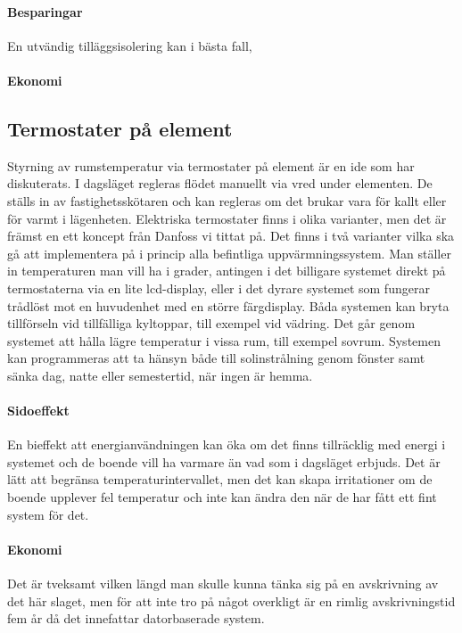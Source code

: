 \paragraph{Besparingar}
En utvändig tilläggsisolering kan i bästa fall, 

\paragraph{Ekonomi}

\subsection{Termostater på element}
Styrning av rumstemperatur via termostater på element är en ide som har diskuterats. I dagsläget regleras flödet manuellt via vred under elementen. De ställs in av fastighetsskötaren och kan regleras om det brukar vara för kallt eller för varmt i lägenheten. 
Elektriska termostater finns i olika varianter, men det är främst en ett koncept från Danfoss vi tittat på. Det finns i två varianter vilka ska gå att implementera på i princip alla befintliga uppvärmningssystem. Man ställer in temperaturen man vill ha i grader, antingen i det billigare systemet direkt på termostaterna via en lite lcd-display, eller i det dyrare systemet som fungerar trådlöst mot en huvudenhet med en större färgdisplay.
Båda systemen kan bryta tillförseln vid tillfälliga kyltoppar, till exempel vid vädring. Det går genom systemet att hålla lägre temperatur i vissa rum, till exempel sovrum. Systemen kan programmeras att ta hänsyn både till solinstrålning genom fönster samt sänka dag, natte eller semestertid, när ingen är hemma.

\paragraph{Sidoeffekt}
En bieffekt att energianvändningen kan öka om det finns tillräcklig med energi i systemet och de boende vill ha varmare än vad som i dagsläget erbjuds. Det är lätt att begränsa temperaturintervallet, men det kan skapa irritationer om de boende upplever fel temperatur och inte kan ändra den när de har fått ett fint system för det.

\paragraph{Ekonomi}
Det är tveksamt vilken längd man skulle kunna tänka sig på en avskrivning av det här slaget, men för att inte tro på något overkligt är en rimlig avskrivningstid fem år då det innefattar datorbaserade system.

